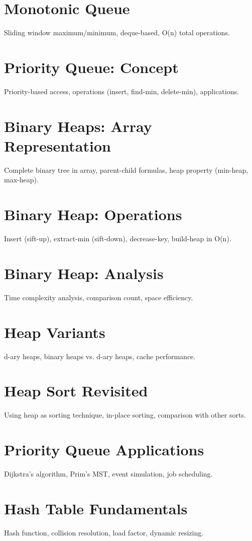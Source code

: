 \chapter{Monotonic Queue}
Sliding window maximum/minimum, deque-based, O(n) total operations.

\chapter{Priority Queue: Concept}
Priority-based access, operations (insert, find-min, delete-min), applications.

\chapter{Binary Heaps: Array Representation}
Complete binary tree in array, parent-child formulas, heap property (min-heap, max-heap).

\chapter{Binary Heap: Operations}
Insert (sift-up), extract-min (sift-down), decrease-key, build-heap in O(n).

\chapter{Binary Heap: Analysis}
Time complexity analysis, comparison count, space efficiency.

\chapter{Heap Variants}
d-ary heaps, binary heaps vs. d-ary heaps, cache performance.

\chapter{Heap Sort Revisited}
Using heap as sorting technique, in-place sorting, comparison with other sorts.

\chapter{Priority Queue Applications}
Dijkstra's algorithm, Prim's MST, event simulation, job scheduling.


\chapter{Hash Table Fundamentals}
Hash function, collision resolution, load factor, dynamic resizing.


